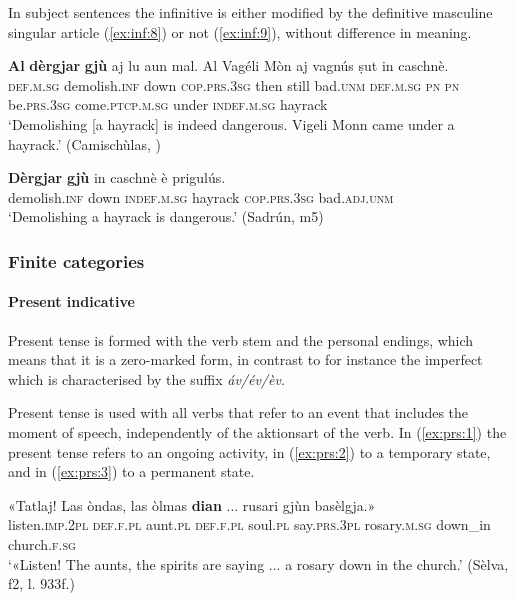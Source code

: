 In subject sentences the infinitive is either modified by the definitive masculine singular article (\ref{ex:inf:8}) or not (\ref{ex:inf:9}), without difference in meaning.
 
\ea
\label{ex:inf:8}
\gll \textbf{Al} \textbf{dèrgjar} \textbf{gjù} aj lu aun mal. Al Vagéli Mòn aj vagnús ṣut in caschnè.\\
\textsc{def.m.sg} demolish.\textsc{inf} down \textsc{cop.prs.3sg} then still bad.\textsc{unm} \textsc{def.m.sg} \textsc{pn} \textsc{pn} be.\textsc{prs.3sg} come.\textsc{ptcp.m.sg} under \textsc{indef.m.sg} hayrack\\
\glt `Demolishing [a hayrack] is indeed dangerous. Vigeli Monn came under a hayrack.' (Camischùlas, )
\z

\ea
\label{ex:inf:9}
\gll \textbf{Dèrgjar} \textbf{gjù} in caschnè è prigulús.\\
demolish.\textsc{inf} down \textsc{indef.m.sg} hayrack \textsc{cop.prs.3sg} bad.\textsc{adj.unm}\\
\glt `Demolishing a hayrack is dangerous.' (Sadrún, m5)
\z

\subsubsection{Finite categories}

\paragraph{Present indicative}
Present tense is formed with the verb stem and the personal endings, which means that it is a zero-marked form, in contrast to for instance the imperfect which is characterised by the suffix \textit{áv/év/èv}.

Present tense is used with all verbs that refer to an event that includes the moment of speech, independently of the aktionsart of the verb. In (\ref{ex:prs:1}) the present tense refers to an ongoing activity, in (\ref{ex:prs:2}) to a temporary state, and in (\ref{ex:prs:3}) to a permanent state.
                     
\ea\label{ex:prs:1}
\gll «Tatlaj! Las òndas, las òlmas \textbf{dian} ... rusari gjùn basèlgja.»  \\
listen.\textsc{imp.2pl} \textsc{def.f.pl} aunt.\textsc{pl} \textsc{def.f.pl} soul.\textsc{pl} say.\textsc{prs.3pl} {} rosary.\textsc{m.sg} down\_in church.\textsc{f.sg}\\
\glt `«Listen! The aunts, the spirits are saying ... a rosary down in the church.' (Sèlva, f2, l. 933f.)
\z

